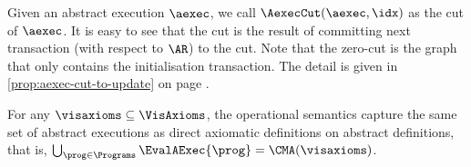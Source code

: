 Given an abstract execution \( \aexec \),
we call \(  \AexecCut(\aexec,\idx) \) as the  cut of \( \aexec \).
It is easy to see that the  cut is the result of 
committing next transaction (with respect to \( \AR \)) to the \Th{\idx} cut.
Note that the zero-cut is the graph that only contains the initialisation transaction.
The detail is given in \cref{prop:aexec-cut-to-update} on page \pageref{sec:proof-aexec-cut-to-trace}.

\begin{toappendix}
\label{sec:proof-equal-axiom-semantics}
\end{toappendix}
\begin{theoremrep}
\label{thm:equivalence-aexec-trace-visaxioms}
For any \( \visaxioms \subseteq \VisAxioms \),
the operational semantics capture the same set of abstract executions as 
direct axiomatic definitions on abstract definitions,
that is, \( \bigcup_{\prog \in \Programs} \EvalAExec{\prog} = \CMA(\visaxioms)\).
\end{theoremrep}
